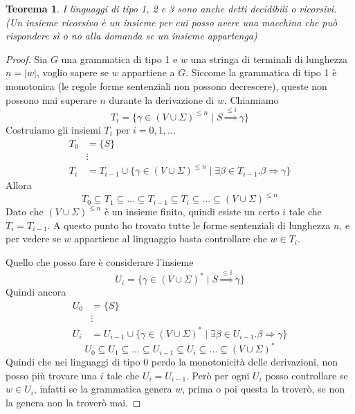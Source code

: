 \documentclass[12pt]{report}
\newtheorem{teorema}{Teorema}
\begin{document}
\begin{teorema}
	I linguaggi di tipo 1, 2 e 3 sono anche detti decidibili o ricorsivi.
	(Un insieme ricorsivo è un insieme per cui posso avere una macchina che può rispondere sì o no alla domanda se un insieme appartenga)
\end{teorema}
\begin{proof}
Sia $G$ una grammatica di tipo 1 e $w$ una stringa di terminali di lunghezza $n = |w|$, voglio sapere se $w$ appartiene a $G$.
Siccome la grammatica di tipo 1 è monotonica (le regole forme sentenziali non possono decrescere), queste non possono mai superare $n$ durante la derivazione di $w$.
Chiamiamo 
$$T_i = \{ \gamma \in (V \cup \Sigma)^{\leq n} \mid S \overset{\leq i}{\Rightarrow} \gamma \}$$
Costruiamo gli insiemi $T_i$ per $i = 0, 1, \dots$
\begin{align*}
	T_0 &= \{ S \} \\
	    &\vdots \\
	T_i &= T_{i - 1} \cup \{ \gamma \in (V \cup \Sigma)^{\leq n} \mid \exists \beta \in T_{i - 1} . \beta \Rightarrow \gamma \} 
\end{align*}
Allora 
$$T_0 \subseteq T_1 \subseteq \dots \subseteq T_{i - 1} \subseteq T_{i} \subseteq \dots \subseteq (V \cup \Sigma)^{\leq n}$$
Dato che $(V \cup \Sigma)^{\leq n}$ è un insieme finito, quindi esiste un certo $i$ tale che $T_i = T_{i - 1}$.
A questo punto ho trovato tutte le forme sentenziali di lunghezza $n$, e per vedere se $w$ appartiene al linguaggio basta controllare che $w \in T_i$.


Quello che posso fare è considerare l'insieme 
$$U_i = \{ \gamma \in (V \cup \Sigma)^* \mid S \overset{\leq i}{\Rightarrow} \gamma \}$$
Quindi ancora
\begin{align*}
	U_0 &= \{ S \} \\
	    &\vdots \\
	U_i &= U_{i - 1} \cup \{ \gamma \in (V \cup \Sigma)^* \mid \exists \beta \in U_{i - 1} . \beta \Rightarrow \gamma \} 
\end{align*}
$$U_0 \subseteq U_1 \subseteq \dots \subseteq U_{i - 1} \subseteq U_{i} \subseteq \dots \subseteq (V \cup \Sigma)^*$$
Quindi che nei linguaggi di tipo 0 perdo la monotonicità delle derivazioni, non posso più trovare una $i$ tale che $U_i = U_{i - 1}$.
Però per ogni $U_i$ posso controllare se $w \in U_i$, infatti se la grammatica genera $w$, prima o poi questa la troverò, se non la genera non la troverò mai.
\end{proof}
\end{document}
